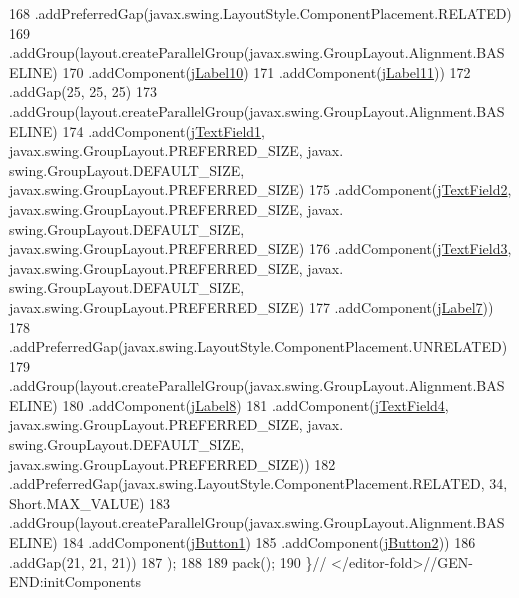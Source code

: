 \begin{DoxyCode}
168                 .addPreferredGap(javax.swing.LayoutStyle.ComponentPlacement.RELATED)
169                 .addGroup(layout.createParallelGroup(javax.swing.GroupLayout.Alignment.BASELINE)
170                     .addComponent(\mbox{\hyperlink{class_interfaz_package_1_1_verificar_lector_aa900aa48aa55e9851fd9085b6303d8af}{jLabel10}})
171                     .addComponent(\mbox{\hyperlink{class_interfaz_package_1_1_verificar_lector_ae75078bb58455233a13a76d47cca166b}{jLabel11}}))
172                 .addGap(25, 25, 25)
173                 .addGroup(layout.createParallelGroup(javax.swing.GroupLayout.Alignment.BASELINE)
174                     .addComponent(\mbox{\hyperlink{class_interfaz_package_1_1_verificar_lector_a7c056e1870eb31ca108b4da56a7d93f4}{jTextField1}}, javax.swing.GroupLayout.PREFERRED\_SIZE, javax.
      swing.GroupLayout.DEFAULT\_SIZE, javax.swing.GroupLayout.PREFERRED\_SIZE)
175                     .addComponent(\mbox{\hyperlink{class_interfaz_package_1_1_verificar_lector_a3f80f83121eebb36d3c494a791ae2e00}{jTextField2}}, javax.swing.GroupLayout.PREFERRED\_SIZE, javax.
      swing.GroupLayout.DEFAULT\_SIZE, javax.swing.GroupLayout.PREFERRED\_SIZE)
176                     .addComponent(\mbox{\hyperlink{class_interfaz_package_1_1_verificar_lector_a0fb6ae08627a62444fca7c09e992446d}{jTextField3}}, javax.swing.GroupLayout.PREFERRED\_SIZE, javax.
      swing.GroupLayout.DEFAULT\_SIZE, javax.swing.GroupLayout.PREFERRED\_SIZE)
177                     .addComponent(\mbox{\hyperlink{class_interfaz_package_1_1_verificar_lector_abffae3dbc14e8cf54a27d75cbd7cb040}{jLabel7}}))
178                 .addPreferredGap(javax.swing.LayoutStyle.ComponentPlacement.UNRELATED)
179                 .addGroup(layout.createParallelGroup(javax.swing.GroupLayout.Alignment.BASELINE)
180                     .addComponent(\mbox{\hyperlink{class_interfaz_package_1_1_verificar_lector_a52d146b88c9bbed0098e87f7e4f3a759}{jLabel8}})
181                     .addComponent(\mbox{\hyperlink{class_interfaz_package_1_1_verificar_lector_a782676dc9af3fa99d3a06020501824f7}{jTextField4}}, javax.swing.GroupLayout.PREFERRED\_SIZE, javax.
      swing.GroupLayout.DEFAULT\_SIZE, javax.swing.GroupLayout.PREFERRED\_SIZE))
182                 .addPreferredGap(javax.swing.LayoutStyle.ComponentPlacement.RELATED, 34, Short.MAX\_VALUE)
183                 .addGroup(layout.createParallelGroup(javax.swing.GroupLayout.Alignment.BASELINE)
184                     .addComponent(\mbox{\hyperlink{class_interfaz_package_1_1_verificar_lector_a104af7dfee375e893832d6c38d12a1dd}{jButton1}})
185                     .addComponent(\mbox{\hyperlink{class_interfaz_package_1_1_verificar_lector_a05b1ef2e05306def8a78c0e4ee0802fb}{jButton2}}))
186                 .addGap(21, 21, 21))
187         );
188 
189         pack();
190     \}\textcolor{comment}{// </editor-fold>//GEN-END:initComponents}
\end{DoxyCode}
